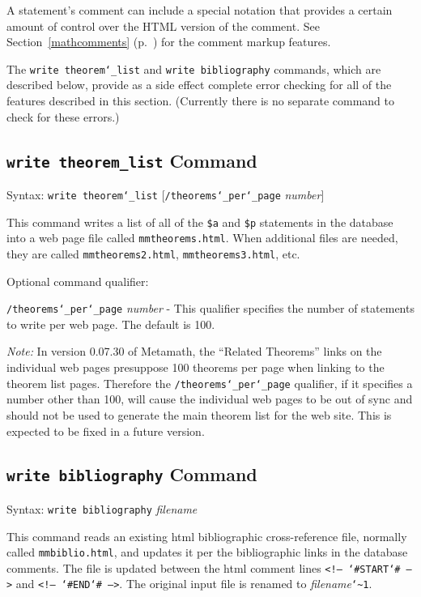 A statement's comment can include a special notation that provides a
certain amount of control over the {\sc HTML} version of the comment.  See
Section~\ref{mathcomments} (p.~\pageref{mathcomments}) for the comment
markup features.

The \texttt{write theorem{\char`\_}list} and \texttt{write bibliography}
commands, which are described below, provide as a side effect complete
error checking for all of the features described in this section.
(Currently there is no separate command to check for these
errors.)

\subsection{\texttt{write theorem\_list}
Command}
Syntax:  \texttt{write theorem{\char`\_}list}
[\texttt{/theorems{\char`\_}per{\char`\_}page} {\em number}]

This command writes a list of all of the \texttt{\$a} and \texttt{\$p}
statements in the database into a web page file
 called \texttt{mmtheorems.html}.
When additional files are needed, they are called
\texttt{mmtheorems2.html}, \texttt{mmtheorems3.html}, etc.

Optional command qualifier:

    \texttt{/theorems{\char`\_}per{\char`\_}page} {\em number} -
 This qualifier specifies the number of statements to
        write per web page.  The default is 100.

{\em Note:} In version 0.07.30 of Metamath, the ``Related Theorems'' links on the individual
web pages presuppose 100 theorems per page when linking to the theorem
list pages.  Therefore the \texttt{/theorems{\char`\_}per{\char`\_}page}
qualifier, if it specifies a number other than 100, will cause the
individual web pages to be out of sync and should not be used to
generate the main theorem list for the web site.  This is expected to be
fixed in a future version.


\subsection{\texttt{write bibliography}\label{wrbib}
Command}
Syntax:  \texttt{write bibliography} {\em filename}

This command reads an existing {\sc html} bibliographic cross-reference
file, normally called \texttt{mmbiblio.html}, and updates it per the
bibliographic links in the database comments.  The file is updated
between the {\sc html} comment lines \texttt{<!--
{\char`\#}START{\char`\#} -->} and \texttt{<!-- {\char`\#}END{\char`\#}
-->}.  The original input file is renamed to {\em
filename}\texttt{{\char`\~}1}.

